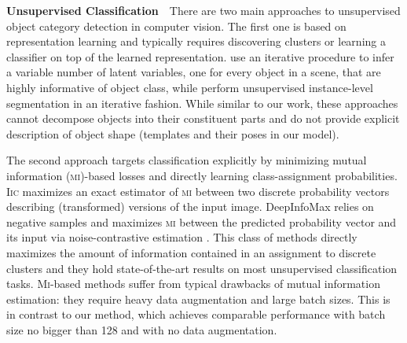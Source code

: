 
\textbf{Unsupervised Classification}\ \ 
There are two main approaches to unsupervised object category detection in computer vision.
The first one is based on representation learning and typically requires discovering clusters or learning a classifier on top of the learned representation.
\cite{Eslami2016,Kosiorek2018sqair} use an iterative procedure to infer a variable number of latent variables, one for every object in a scene, that are highly informative of object class, while \cite{Greff2019multi,Burgess2019monet} perform unsupervised instance-level segmentation in an iterative fashion.
While similar to our work, these approaches cannot decompose objects into their constituent parts and do not provide explicit description of object shape (\!\eg templates and their poses in our model).

The second approach targets classification explicitly by minimizing mutual information (\textsc{mi})-based losses and directly learning class-assignment probabilities.
\textsc{Iic} \citep{Iic} maximizes an exact estimator of \textsc{mi} between two discrete probability vectors describing (transformed) versions of the input image.
DeepInfoMax \citep{Hjelm2019deepinfomax} relies on negative samples and maximizes \textsc{mi} between the predicted probability vector and its input via noise-contrastive estimation \citep{Gutmann2010nce}.
This class of methods directly maximizes the amount of information contained in an assignment to discrete clusters and they hold state-of-the-art results on most unsupervised classification tasks.
\textsc{Mi}-based methods suffer from typical drawbacks of mutual information estimation: they require heavy data augmentation and large batch sizes.
This is in contrast to our method, which achieves comparable performance with batch size no bigger than 128 and with no data augmentation.

